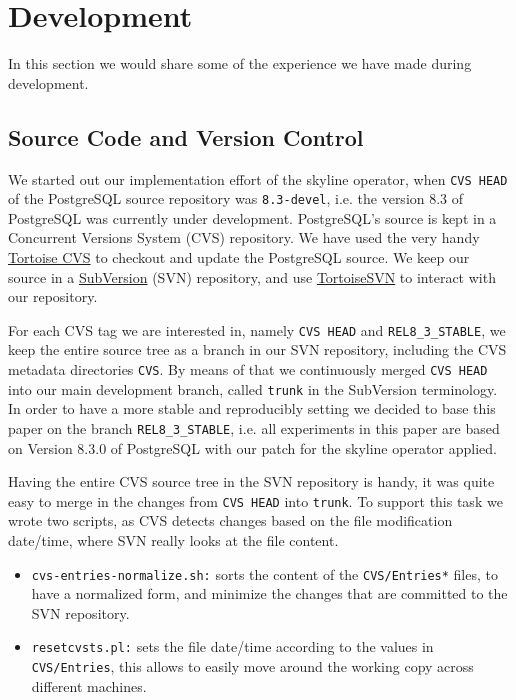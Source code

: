 \section{Development}
In this section we would share some of the experience we have made 
during development.

\subsection{Source Code and Version Control}
We started out our implementation effort of the skyline operator, when
\texttt{CVS HEAD} of the PostgreSQL source repository was
\texttt{8.3-devel}, i.e. the version 8.3 of PostgreSQL was currently
under development.  PostgreSQL's source is kept in a Concurrent Versions
System (CVS) repository.  We have used the very handy
\href{http://www.tortoisecvs.org/}{Tortoise CVS} to checkout and
update the PostgreSQL source.  We keep our source in a
\href{http://subversion.tigris.org/}{SubVersion} (SVN) repository, and use
\href{http://tortoisesvn.tigris.org/}{TortoiseSVN} to interact with our
repository.

For each CVS tag we are interested in, namely \texttt{CVS HEAD} and
\texttt{REL8\_3\_STABLE}, we keep the entire source tree as a branch 
in our SVN repository, including the CVS metadata directories
\texttt{CVS}.  By means of that we continuously merged \texttt{CVS HEAD}
into our main development branch, called \texttt{trunk} in the
SubVersion terminology.  In order to have a more stable and
reproducibly setting we decided to base this paper on the branch
\texttt{REL8\_3\_STABLE}, i.e. all experiments in this paper are based
on Version 8.3.0 of PostgreSQL with our patch for the skyline
operator applied.

Having the entire CVS source tree in the SVN repository is handy, it
was quite easy to merge in the changes from \texttt{CVS HEAD} into
\texttt{trunk}.  To support this task we wrote two scripts, as CVS
detects changes based on the file modification date/time, where SVN
really looks at the file content.

\begin{itemize}
\item \texttt{cvs-entries-normalize.sh:}
sorts the content of the \texttt{CVS/Entries*} files, to have a
normalized form, and minimize the changes that are committed to the
SVN repository.

\item \texttt{resetcvsts.pl:}
sets the file date/time according to the values in \texttt{CVS/Entries},
this allows to easily move around the working copy across different machines.
\end{itemize}

